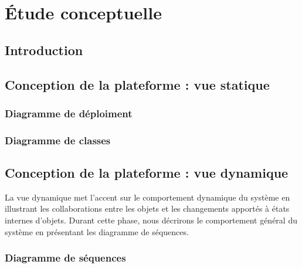 \chapter{Étude conceptuelle}
\label{sec:troisiemechapitre}

\section{Introduction}



\section{Conception de la plateforme : vue statique}

\vspace{5mm}

\subsection{Diagramme de déploiment}

\vspace{5mm}

\subsection{Diagramme de classes}
\vspace{5mm}






\section{Conception de la plateforme : vue dynamique}
La vue dynamique met l’accent sur le comportement dynamique du système en illustrant les collaborations entre les objets et les changements apportés à états internes d'objets. Durant cette phase, nous décrirons le comportement général du système en présentant les diagramme de séquences.
\vspace{5mm}

\subsection{Diagramme de séquences}
\vspace{5mm}


